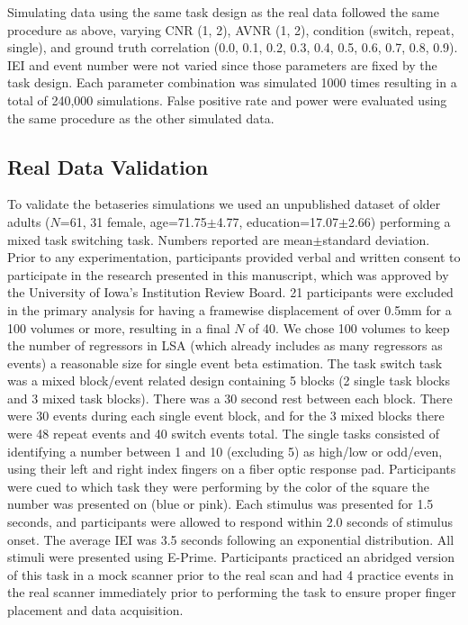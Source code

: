 \documentclass[10pt,letterpaper]{article}
\begin{document}
Simulating data using the same task design as the real data followed the same
procedure as above, varying CNR (1, 2), AVNR (1, 2), condition (switch, repeat, single),
and ground truth correlation (0.0, 0.1, 0.2, 0.3, 0.4, 0.5, 0.6, 0.7, 0.8, 0.9).
IEI and event number were not varied since those parameters are fixed by the
task design.
Each parameter combination was simulated 1000 times resulting in a total of 240,000 simulations.
False positive rate and power were evaluated using the same procedure as the other simulated data.

\subsection*{Real Data Validation}
\label{methods:task-switch}

To validate the betaseries simulations we used an unpublished dataset
of older adults ($N$=61, 31 female, age=71.75$\pm$4.77, education=17.07$\pm$2.66)
performing a mixed task switching task.
Numbers reported are mean$\pm$standard deviation.
Prior to any experimentation, participants provided verbal and written consent
to participate in the research presented in this manuscript, which was approved
by the University of Iowa's Institution Review Board.
21 participants were excluded in the primary analysis for having a
framewise displacement of over 0.5mm for a 100 volumes or more,
resulting in a final $N$ of 40.
We chose 100 volumes to keep the number of regressors in LSA
(which already includes as many regressors as events) a reasonable size
for single event beta estimation.
The task switch task was a mixed block/event related design containing
5 blocks (2 single task blocks and 3 mixed task blocks).
There was a 30 second rest between each block.
There were 30 events during each single event block,
and for the 3 mixed blocks there were 48 repeat events and 40 switch events total.
The single tasks consisted of identifying a number between
1 and 10 (excluding 5) as high/low or odd/even, using their left and right index fingers
on a fiber optic response pad.
Participants were cued to which task they were performing by the color of the square
the number was presented on (blue or pink).
Each stimulus was presented for 1.5 seconds, and participants were allowed
to respond within 2.0 seconds of stimulus onset.
The average IEI was 3.5 seconds following an exponential distribution.
All stimuli were presented using E-Prime.
Participants practiced an abridged version of this task in a mock scanner
prior to the real scan and had 4 practice events in the real scanner immediately
prior to performing the task to ensure proper finger placement and data acquisition.
\end{document}

